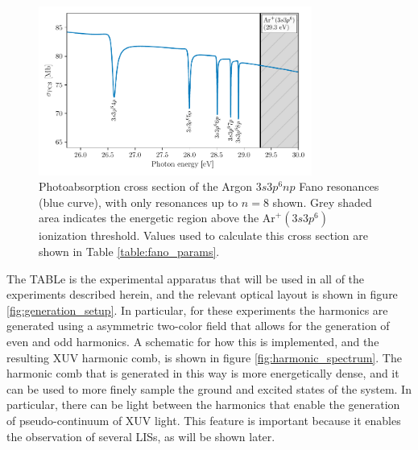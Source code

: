 \begin{figure}
	\centering
	\includegraphics[width=0.8\textwidth]{figures/ATS/fano_GS.pdf}
	\caption[Photoabsorption cross section of the Argon $3s3p^6np$ Fano resonances]{Photoabsorption cross section of the Argon $3s3p^6np$ Fano resonances (blue curve), with only resonances up to $n=8$ shown.  Grey shaded area indicates the energetic region above the $\mathrm{Ar}^+(3s3p^6)$ ionization threshold. Values used to calculate this cross section are shown in Table \ref{table:fano_params}.}
	\label{fig:fano_gs_pcs}
\end{figure}

The TABLe is the experimental apparatus that will be used in all of the experiments described herein, and the relevant optical layout is shown in figure \ref{fig:generation_setup}.  In particular, for these experiments the harmonics are generated using a asymmetric two-color field that allows for the generation of even and odd harmonics. A schematic for how this is implemented, and the resulting XUV harmonic comb, is shown in figure \ref{fig:harmonic_spectrum}.  The harmonic comb that is generated in this way is more energetically dense, and it can be used to more finely sample the ground and excited states of the system.  In particular, there can be light between the harmonics that enable the generation of pseudo-continuum of XUV light.  This feature is important because it enables the observation of several LISs, as will be shown later.

